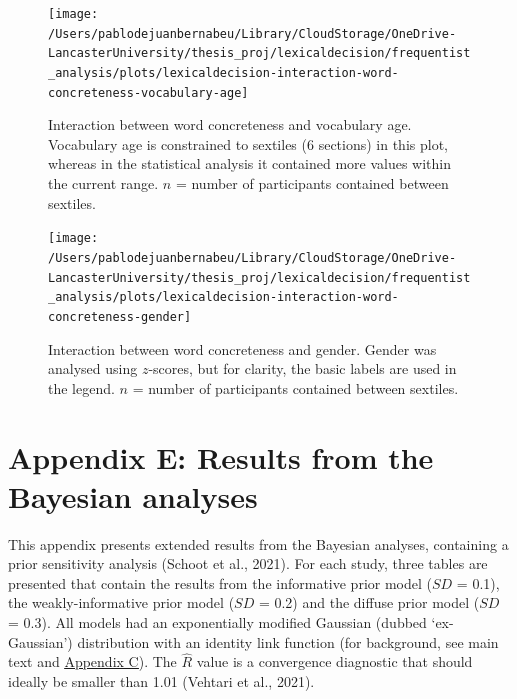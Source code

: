 \documentclass[
  12pt,
  man,floatsintext]{apa7}
\begin{document}
\begin{figure}

{\centering \texttt{[image: /Users/pablodejuanbernabeu/Library/CloudStorage/OneDrive-LancasterUniversity/thesis\_proj/lexicaldecision/frequentist\_analysis/plots/lexicaldecision-interaction-word-concreteness-vocabulary-age]} 

}

\caption{Interaction between word concreteness and vocabulary age. Vocabulary age is constrained to sextiles (6 sections) in this plot, whereas in the statistical analysis it contained more values within the current range. \(n\) = number of participants contained between sextiles.}\label{fig:lexicaldecision-interaction-word-concreteness-vocabulary-age}
\end{figure}



\begin{figure}

{\centering \texttt{[image: /Users/pablodejuanbernabeu/Library/CloudStorage/OneDrive-LancasterUniversity/thesis\_proj/lexicaldecision/frequentist\_analysis/plots/lexicaldecision-interaction-word-concreteness-gender]} 

}

\caption{Interaction between word concreteness and gender. Gender was analysed using \(z\)-scores, but for clarity, the basic labels are used in the legend. \(n\) = number of participants contained between sextiles.}\label{fig:lexicaldecision-interaction-word-concreteness-gender}
\end{figure}

\clearpage

\renewcommand{\thefigure}{E\arabic{figure}} \setcounter{figure}{0}
\renewcommand{\thetable}{E\arabic{table}} \setcounter{table}{0}

\hypertarget{appendix-E-Bayesian-analysis-results}{%
\section{Appendix E: Results from the Bayesian analyses}\label{appendix-E-Bayesian-analysis-results}}

This appendix presents extended results from the Bayesian analyses, containing a prior sensitivity analysis (Schoot et al., 2021). For each study, three tables are presented that contain the results from the informative prior model (\(SD\) = 0.1), the weakly-informative prior model (\(SD\) = 0.2) and the diffuse prior model (\(SD\) = 0.3). All models had an exponentially modified Gaussian (dubbed `ex-Gaussian') distribution with an identity link function (for background, see main text and \protect\hyperlink{appendix-C-Bayesian-analysis-diagnostics}{\underline{Appendix C}}). The \(\widehat R\) value is a convergence diagnostic that should ideally be smaller than 1.01 (Vehtari et al., 2021).
\end{document}
